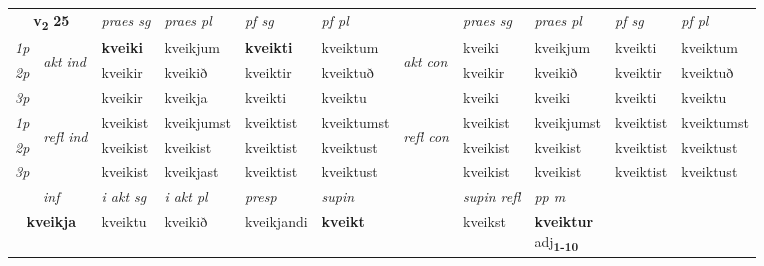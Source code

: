 \noindent
\begin{tabular}{lllllllllll} \toprule
\multicolumn{2}{c}{\textbf{v{\textsubscript{2}}} \Large{\textbf{25}}}  &  \textit{praes sg}  & \textit{praes pl}  &\textit{ pf sg} & \textit{pf pl} &  &  \textit{praes sg}  & \textit{praes pl}  & \textit{pf sg} & \textit{pf pl } \\*
	\cmidrule{3-6} \cmidrule{8-11}
 {\textit{1p}} & \multirow{3}{*}{\begin{turn}{90}\textit{akt ind}\end{turn}} & \textbf{kveiki} & kveikjum & \textbf{kveikti} & kveiktum & \multirow{3}{*}{\begin{turn}{90}\textit{akt con}\end{turn}} &kveiki & kveikjum & kveikti & kveiktum\\*
 {\textit{2p}} &  &  kveikir  & kveikið & kveiktir & kveiktuð & & kveikir & kveikið & kveiktir & kveiktuð \\*
{\textit{3p}} &  & kveikir & kveikja & kveikti & kveiktu & & kveiki & kveiki& kveikti & kveiktu \\*
\cmidrule{3-6} \cmidrule{8-11}
 {\textit{1p}} & \multirow{3}{*}{\begin{turn}{90}\textit{refl ind}\end{turn}}  & kveikist & kveikjumst & kveiktist & kveiktumst & \multirow{3}{*}{\begin{turn}{90}\textit{refl con}\end{turn}}  &kveikist & kveikjumst & kveiktist & kveiktumst \\*
 {\textit{2p}} &  & kveikist & kveikist & kveiktist & kveiktust & &kveikist & kveikist & kveiktist & kveiktust \\*
 {\textit{3p}}  & & kveikist & kveikjast & kveiktist & kveiktust & & kveikist & kveikist& kveiktist & kveiktust \\*
\cmidrule{3-6} \cmidrule{8-11}

   \multicolumn{2}{c}{\textit{inf}}  & \textit{i akt sg} & \textit{i akt pl}   & \textit{presp} & \textit{supin} && \textit{supin refl} & \textit{pp m} \\*
  \multicolumn{2}{c}{\textbf{kveikja}} & kveiktu  & kveikið   & kveikjandi &  \textbf{kveikt} && kveikst & \specialcell{\textbf{kveiktur} \\ adj\textbf{\textsubscript{1-10}}} \\*
\end{tabular}

